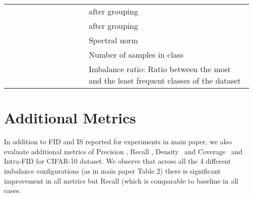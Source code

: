 \documentclass[runningheads,table]{llncs}
\begin{document}
\begin{table}[t]
{\begin{tabular}{p{0.1\linewidth} p{0.225
\linewidth} p{0.65\linewidth}}
    &       &  after grouping                                                  \\
       &       &  after grouping                                                   \\
          &                      & Spectral norm                                                                         \\
                   &                        & Number of samples in class                                                         \\
                  &                        & Imbalance ratio: Ratio between the most and the least frequent classes of the dataset \\ \bottomrule
\end{tabular}}
\end{table}

\section{Additional Metrics}
\label{sec:supp:metrics}
In addition to FID and IS reported for experiments in main paper, we also evaluate additional metrics of Precision \cite{kynkaanniemi2019improved}, Recall \cite{kynkaanniemi2019improved}, Density~\cite{yu2020inclusive} and Coverage~\cite{yu2020inclusive} and Intra-FID for CIFAR-10 dataset.
We observe that across all the 4 different imbalance configurations (as in main paper Table {\color{red} 2}) there is significant improvement in all metrics but Recall (which is comparable to baseline in all cases.
\end{document}
